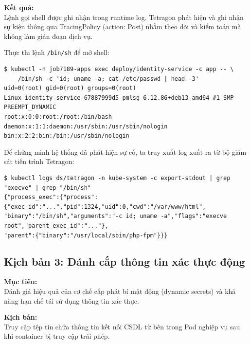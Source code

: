 \textbf{Kết quả:}\\
Lệnh gọi shell được ghi nhận trong runtime log. Tetragon phát hiện và ghi nhận sự kiện thông qua TracingPolicy (action: Post) nhằm theo dõi và kiểm toán mà không làm gián đoạn dịch vụ.


Thực thi lệnh \texttt{/bin/sh} để mở shell:
\begin{listing}[H]
\begin{verbatim}
$ kubectl -n job7189-apps exec deploy/identity-service -c app -- \
    /bin/sh -c 'id; uname -a; cat /etc/passwd | head -3'
uid=0(root) gid=0(root) groups=0(root)
Linux identity-service-67887999d5-pmlsg 6.12.86+deb13-amd64 #1 SMP PREEMPT_DYNAMIC
root:x:0:0:root:/root:/bin/bash
daemon:x:1:1:daemon:/usr/sbin:/usr/sbin/nologin
bin:x:2:2:bin:/bin:/usr/sbin/nologin
\end{verbatim}
\caption{Thực thi shell vào trong Pod nghiệp vụ}
\label{lst:kb2_exec_output}
\end{listing}

Để chứng minh hệ thống đã phát hiện sự cố, ta truy xuất log xuất ra từ bộ giám sát tiến trình Tetragon:
\begin{listing}[H]
\begin{verbatim}
$ kubectl logs ds/tetragon -n kube-system -c export-stdout | grep "execve" | grep "/bin/sh"
{"process_exec":{"process":{"exec_id":"...","pid":1324,"uid":0,"cwd":"/var/www/html",
"binary":"/bin/sh","arguments":"-c id; uname -a","flags":"execve root","parent_exec_id":"..."},
"parent":{"binary":"/usr/local/sbin/php-fpm"}}}
\end{verbatim}
\caption{Log của Tetragon (xuất qua stdout) ghi nhận rõ ràng tiến trình cha là php-fpm đã gọi bash trái phép}
\label{lst:kb2_tetragon_log}
\end{listing}


\subsection{Kịch bản 3: Đánh cắp thông tin xác thực động}
\label{subsec:kb3_credential_theft}

\textbf{Mục tiêu:}\\
Đánh giá hiệu quả của cơ chế cấp phát bí mật động (dynamic secrets) và khả năng hạn chế tái sử dụng thông tin xác thực.

\textbf{Kịch bản:}\\
Truy cập tệp tin chứa thông tin kết nối CSDL từ bên trong Pod nghiệp vụ sau khi container bị truy cập trái phép.

